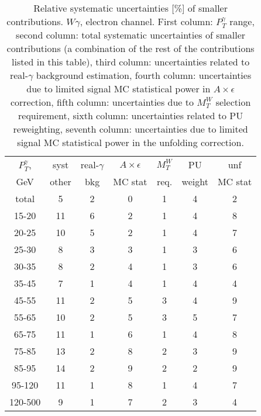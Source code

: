 \begin{table}[h]
  \scriptsize
  \begin{center}
  \caption{Relative systematic uncertainties [\%] of smaller contributions. $W\gamma$, electron channel. First column: $P_T^{\gamma}$ range, second column: total systematic uncertainties of smaller contributions (a combination of the rest of the contributions listed in this table), third column: uncertainties related to real-$\gamma$ background estimation, fourth column: uncertainties due to limited signal MC statistical power in $A\times\epsilon$ correction, fifth column: uncertainties due to $M_T^W$ selection requirement,  sixth column: uncertainties related to PU reweighting, seventh column:  uncertainties due to limited signal MC statistical power in the unfolding correction.}
  \begin{tabular}{|c|c|c|c|c|c|c|}
    $P_T^{\gamma}$,  & syst & real-$\gamma$ & $A\times\epsilon$ & $M_T^W$ & PU & unf\\
    GeV  & other & bkg & MC stat & req. & weight & MC stat\\ \hline
    total  & 5 & 2 & 0 & 1 & 4 & 2 \\ \hline
    15-20 & 11 & 6 & 2 & 1 & 4 & 8 \\ \hline
    20-25 & 10 & 5 & 2 & 1 & 4 & 7 \\ \hline
    25-30 & 8 & 3 & 3 & 1 & 3 & 6 \\ \hline
    30-35 & 8 & 2 & 4 & 1 & 3 & 6 \\ \hline
    35-45 & 7 & 1 & 4 & 1 & 4 & 4 \\ \hline
    45-55 & 11 & 2 & 5 & 3 & 4 & 9 \\ \hline
    55-65 & 10 & 2 & 5 & 3 & 5 & 7 \\ \hline
    65-75 & 11 & 1 & 6 & 1 & 4 & 8 \\ \hline
    75-85 & 13 & 2 & 8 & 2 & 3 & 9 \\ \hline
    85-95 & 14 & 2 & 9 & 2 & 2 & 9 \\ \hline
    95-120 & 11 & 1 & 8 & 1 & 4 & 7 \\ \hline
    120-500 & 9 & 1 & 7 & 2 & 3 & 4 \\ \hline
  \end{tabular}
  \label{tab:systInPercentSmallSysts_ELECTRON_WGamma}
  \end{center}
\end{table}
